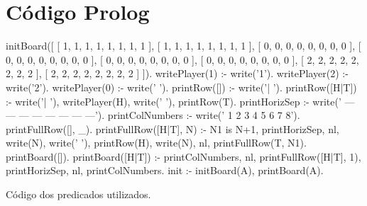 \documentclass[15pt,a4paper]{article}
\begin{document}
\appendix
\section{Código Prolog}

\begin{code}[H]
	\begin{verbatimtab} %
initBoard([
	   [ 1, 1, 1, 1, 1, 1, 1, 1 ],
	   [ 1, 1, 1, 1, 1, 1, 1, 1 ],
	   [ 0, 0, 0, 0, 0, 0, 0, 0 ],
	   [ 0, 0, 0, 0, 0, 0, 0, 0 ],
	   [ 0, 0, 0, 0, 0, 0, 0, 0 ],
	   [ 0, 0, 0, 0, 0, 0, 0, 0 ],
	   [ 2, 2, 2, 2, 2, 2, 2, 2 ],
	   [ 2, 2, 2, 2, 2, 2, 2, 2 ]
	  ]).
writePlayer(1) :-
	write('1').
writePlayer(2) :-
	write('2').
writePlayer(0) :-
	write(' ').
printRow([])    :- 
	write('| ').
printRow([H|T]) :-
	write('| '),
	writePlayer(H),
	write(' '),
	printRow(T).
printHorizSep   :-
	write('   --- --- --- --- --- --- --- ---').
printColNumbers :-
	write('    1   2   3   4   5   6   7   8').
printFullRow([], _).
printFullRow([H|T], N) :-
	N1 is N+1,
	printHorizSep,
	nl,
	write(N),
	write(' '),
	printRow(H),
	write(N),
	nl,
	printFullRow(T, N1).
printBoard([]).
printBoard([H|T]) :-
	printColNumbers,
	nl,
	printFullRow([H|T], 1),
	printHorizSep,
	nl,
	printColNumbers.
init :-
	initBoard(A),
	printBoard(A).
\end{verbatimtab}
\caption{Código dos predicados utilizados.}
\end{code}
\end{document}
